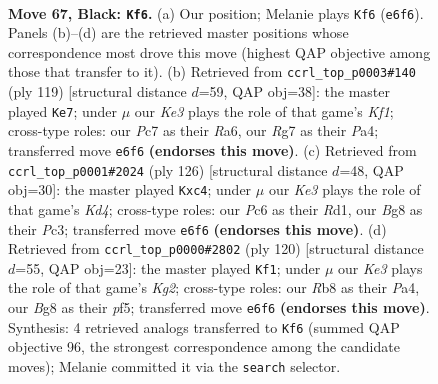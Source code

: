 \documentclass[11pt]{article}
\begin{document}
\clearpage

\begin{figure}[p]\centering
\begin{subfigure}{0.46\textwidth}\centering
\resizebox{\linewidth}{!}{%
\newchessgame
\chessboard[
  setfen={1r4b1/p1p3r1/P1p1k1p1/2P2p1p/RP3P1P/6R1/5K2/1N6 b - - 57 67},
  showmover=false,
  pgfstyle=straightmove, color=movearrow, markmove={e6-f6}
]}
\caption{}
\end{subfigure}\hfill
\begin{subfigure}{0.46\textwidth}\centering
\resizebox{\linewidth}{!}{%
\newchessgame
\chessboard[
  setfen={2r1bk2/5p2/r3p1p1/4P1P1/p1P4P/N1K5/1R6/4R3 b - - 44 60},
  showmover=false,
  pgfstyle=straightmove, color=movearrow, markmove={f8-e7}
]}
\caption{}
\end{subfigure}
\\[4pt]
\begin{subfigure}{0.46\textwidth}\centering
\resizebox{\linewidth}{!}{%
\newchessgame
\chessboard[
  setfen={5r2/1bk5/4r1p1/pP5p/B1pKPp1P/2P5/4R1P1/3R4 w - - 1 64},
  showmover=false,
  pgfstyle=straightmove, color=movearrow, markmove={d4-c4}
]}
\caption{}
\end{subfigure}\hfill
\begin{subfigure}{0.46\textwidth}\centering
\resizebox{\linewidth}{!}{%
\newchessgame
\chessboard[
  setfen={4B3/2p3k1/3bRr2/p2P1p2/P6p/1P1R3P/2r2PK1/8 w - - 10 61},
  showmover=false,
  pgfstyle=straightmove, color=movearrow, markmove={g2-f1}
]}
\caption{}
\end{subfigure}
\caption{\textbf{Move 67, Black: \texttt{Kf6}.} (a) Our position; Melanie plays \texttt{Kf6} (\texttt{e6f6}). Panels (b)--(d) are the retrieved master positions whose correspondence most drove this move (highest QAP objective among those that transfer to it). (b) Retrieved from \texttt{ccrl\_top\_p0003\#140} (ply 119) [structural distance $d$=59, QAP obj=38]: the master played \texttt{Ke7}; under $\mu$ our \emph{Ke3} plays the role of that game's \emph{Kf1}; cross-type roles: our \emph{P}c7 as their \emph{R}a6, our \emph{R}g7 as their \emph{P}a4; transferred move \texttt{e6f6} \textbf{(endorses this move)}. (c) Retrieved from \texttt{ccrl\_top\_p0001\#2024} (ply 126) [structural distance $d$=48, QAP obj=30]: the master played \texttt{Kxc4}; under $\mu$ our \emph{Ke3} plays the role of that game's \emph{Kd4}; cross-type roles: our \emph{P}c6 as their \emph{R}d1, our \emph{B}g8 as their \emph{P}c3; transferred move \texttt{e6f6} \textbf{(endorses this move)}. (d) Retrieved from \texttt{ccrl\_top\_p0000\#2802} (ply 120) [structural distance $d$=55, QAP obj=23]: the master played \texttt{Kf1}; under $\mu$ our \emph{Ke3} plays the role of that game's \emph{Kg2}; cross-type roles: our \emph{R}b8 as their \emph{P}a4, our \emph{B}g8 as their \emph{p}f5; transferred move \texttt{e6f6} \textbf{(endorses this move)}. Synthesis: 4 retrieved analogs transferred to \texttt{Kf6} (summed QAP objective 96, the strongest correspondence among the candidate moves); Melanie committed it via the \texttt{search} selector.}
\label{fig:thought-m133}
\end{figure}
\end{document}
